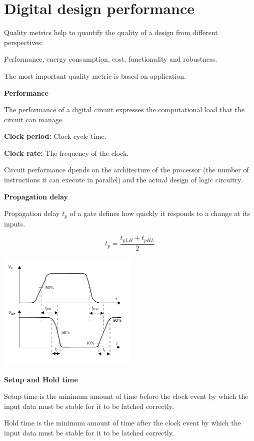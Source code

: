 \section{Digital design performance}

Quality metrics help to quantify the quality of a design
from different perspectives:

Performance, energy consumption, cost, functionality and robustness.

The most important quality metric is based on application.


\textbf{Performance}

The performance of a digital circuit expresses the computational
load that the circuit can manage.

\textbf{Clock period:} Clock cycle time.

\textbf{Clock rate:} The frequency of the clock.

Circuit performance dpends on the architecture of the processor
(the number of instructions it can execute in parallel)
and the actual design of logic circuitry.


\textbf{Propagation delay}

Propagation delay $t_p$ of a gate defines how quickly it responds
to a change at its inputs.

$$ t_p = \frac{t_{pLH}+t_{pHL}}{2}$$

\begin{center}
	\includegraphics[width=0.5\textwidth]{images/propagationDelay.png}
\end{center}

\textbf{Setup and Hold time}

Setup time is the minimum amount of time before the clock event by
which the input data must be stable for it to be latched correctly.

Hold time is the minimum amount of time after the clock event by
which the input data must be stable for it to be latched correctly.


